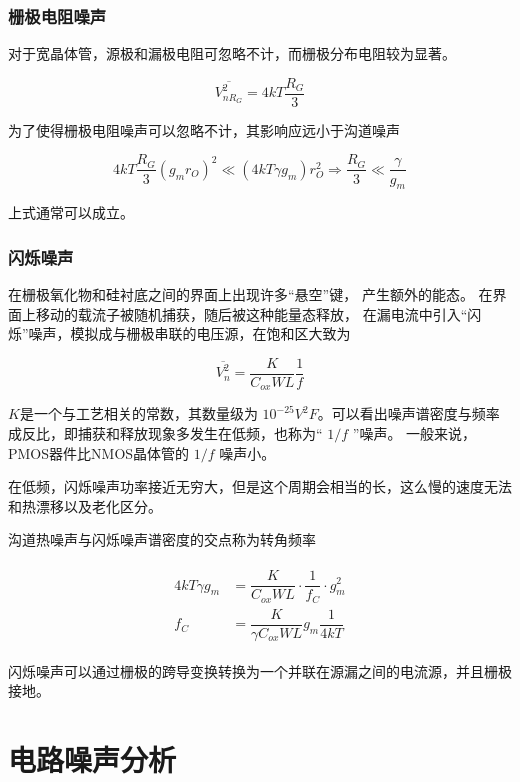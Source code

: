 \documentclass[cn,11pt,chinese,black,simple]{../elegantbook}
\begin{document}
\subsubsection{栅极电阻噪声}

对于宽晶体管，源极和漏极电阻可忽略不计，而栅极分布电阻较为显著。

\[\overline{V^2_{nR_G}} = 4 k T \dfrac{R_G}{3}\]



为了使得栅极电阻噪声可以忽略不计，其影响应远小于沟道噪声

\[4 k T \dfrac{R_{G}}{3}\left(g_{m} r_{O}\right)^{2} \ll\left(4 k T \gamma g_{m}\right) r_{O}^{2} \Rightarrow \dfrac{R_{G}}{3} \ll \dfrac{\gamma}{g_{m}}\]

上式通常可以成立。

\subsubsection{闪烁噪声}

在栅极氧化物和硅衬底之间的界面上出现许多“悬空”键，
产生额外的能态。
在界面上移动的载流子被随机捕获，随后被这种能量态释放，
在漏电流中引入“闪烁”噪声，模拟成与栅极串联的电压源，在饱和区大致为

\[\overline{V_n^2} = \dfrac{K}{C_{ox} WL} \dfrac{1}{f}\]

\(K\)是一个与工艺相关的常数，其数量级为 \(10^{-25} V^{2} F\)。可以看出噪声谱密度与频率成反比，即捕获和释放现象多发生在低频，也称为“ \(1/f\) ”噪声。 一般来说，PMOS器件比NMOS晶体管的 \(1/f\) 噪声小。

在低频，闪烁噪声功率接近无穷大，但是这个周期会相当的长，这么慢的速度无法和热漂移以及老化区分。

沟道热噪声与闪烁噪声谱密度的交点称为转角频率

\[\begin{array}{c}
    \begin{aligned}
        
    4 k T \gamma g_{m}&=\dfrac{K}{C_{o x} W L} \cdot \dfrac{1}{f_{C}} \cdot g_{m}^{2} \\
    f_{C}&=\dfrac{K}{\gamma C_{o x} W L} g_{m} \dfrac{1}{4 k T}
    \end{aligned}
\end{array}\]

闪烁噪声可以通过栅极的跨导变换转换为一个并联在源漏之间的电流源，并且栅极接地。

\section{电路噪声分析}
\end{document}
